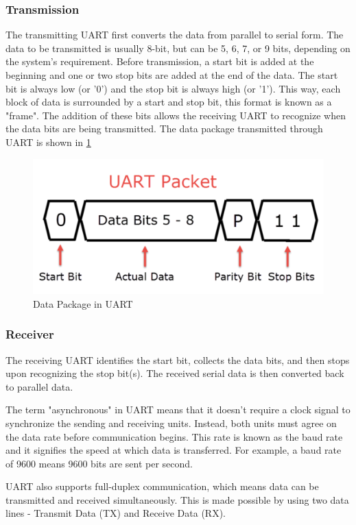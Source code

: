 \documentclass[12pt, a4paper, oneside]{report}
\begin{document}
\subsubsection{Transmission}
The transmitting UART first converts the data from parallel to serial form. The data to be transmitted is usually 8-bit, but can be 5, 6, 7, or 9 bits, depending on the system's requirement. Before transmission, a start bit is added at the beginning and one or two stop bits are added at the end of the data. The start bit is always low (or '0') and the stop bit is always high (or '1'). This way, each block of data is surrounded by a start and stop bit, this format is known as a "frame". The addition of these bits allows the receiving UART to recognize when the data bits are being transmitted. The data package transmitted through UART is shown in \ref{com:pac}
\begin{figure}[!h]
    \centering
    \includegraphics[scale=0.7]{pic/communication/uart1.png}
    \caption{Data Package in UART}
    \label{com:pac}
\end{figure}
\subsubsection{Receiver}
The receiving UART identifies the start bit, collects the data bits, and then stops upon recognizing the stop bit(s). The received serial data is then converted back to parallel data.

The term "asynchronous" in UART means that it doesn't require a clock signal to synchronize the sending and receiving units. Instead, both units must agree on the data rate before communication begins. This rate is known as the baud rate and it signifies the speed at which data is transferred. For example, a baud rate of 9600 means 9600 bits are sent per second.

UART also supports full-duplex communication, which means data can be transmitted and received simultaneously. This is made possible by using two data lines - Transmit Data (TX) and Receive Data (RX).
\end{document}
